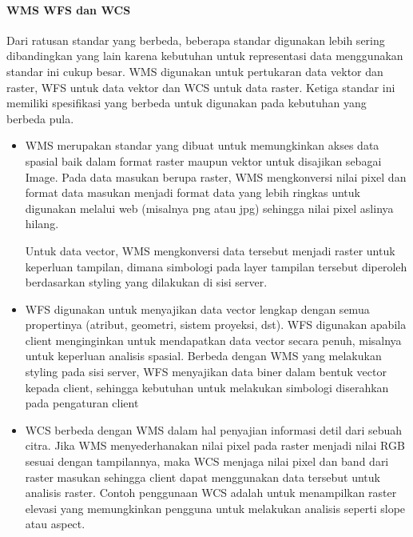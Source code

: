 \documentclass[letterpaper,10pt,english]{sphinxmanual}
\begin{document}
\paragraph{WMS WFS dan WCS}
\label{\detokenize{sesi3/interoperabilitas:wms-wfs-dan-wcs}}
Dari ratusan standar yang berbeda, beberapa standar digunakan lebih sering dibandingkan yang lain karena kebutuhan untuk representasi data menggunakan standar ini cukup besar. WMS digunakan untuk pertukaran data vektor dan raster, WFS untuk data vektor dan WCS untuk data raster. Ketiga standar ini memiliki spesifikasi yang berbeda untuk digunakan pada kebutuhan yang berbeda pula.
\begin{itemize}
\item {} 
WMS merupakan standar yang dibuat untuk memungkinkan akses data spasial baik dalam format raster maupun vektor untuk disajikan sebagai Image. Pada data masukan berupa raster, WMS mengkonversi nilai pixel dan format data masukan menjadi format data yang lebih ringkas untuk digunakan melalui web (misalnya png atau jpg) sehingga nilai pixel aslinya hilang.


Untuk data vector, WMS mengkonversi data tersebut menjadi raster untuk keperluan tampilan, dimana simbologi pada layer tampilan tersebut diperoleh berdasarkan styling yang dilakukan di sisi server.


\item {} 
WFS digunakan untuk menyajikan data vector lengkap dengan semua propertinya (atribut, geometri, sistem proyeksi, dst). WFS digunakan apabila client menginginkan untuk mendapatkan data vector secara penuh, misalnya untuk keperluan analisis spasial. Berbeda dengan WMS yang melakukan styling pada sisi server, WFS menyajikan data biner dalam bentuk vector kepada client, sehingga kebutuhan untuk melakukan simbologi diserahkan pada pengaturan client


\item {} 
WCS berbeda dengan WMS dalam hal penyajian informasi detil dari sebuah citra. Jika WMS menyederhanakan nilai pixel pada raster menjadi nilai RGB sesuai dengan tampilannya, maka WCS menjaga nilai pixel dan band dari raster masukan sehingga client dapat menggunakan data tersebut untuk analisis raster. Contoh penggunaan WCS adalah untuk menampilkan raster elevasi yang memungkinkan pengguna untuk melakukan analisis seperti slope atau aspect.

\end{itemize}
\end{document}
